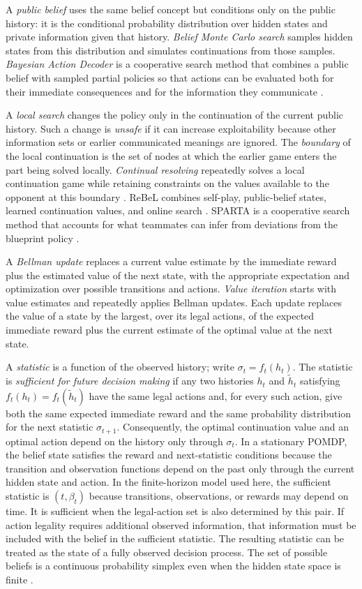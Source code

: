 A \emph{public belief} uses the same belief concept but conditions only on the public history: it is the conditional probability distribution over hidden states and private information given that history. \emph{Belief Monte Carlo search} samples hidden states from this distribution and simulates continuations from those samples. \emph{Bayesian Action Decoder} is a cooperative search method that combines a public belief with sampled partial policies so that actions can be evaluated both for their immediate consequences and for the information they communicate \cite{foerster2019bad}.

A \emph{local search} changes the policy only in the continuation of the current public history. Such a change is \emph{unsafe} if it can increase exploitability because other information sets or earlier communicated meanings are ignored. The \emph{boundary} of the local continuation is the set of nodes at which the earlier game enters the part being solved locally. \emph{Continual resolving} repeatedly solves a local continuation game while retaining constraints on the values available to the opponent at this boundary \cite{burch2014solving}. ReBeL combines self-play, public-belief states, learned continuation values, and online search \cite{brown2020rebel}. SPARTA is a cooperative search method that accounts for what teammates can infer from deviations from the blueprint policy \cite{lerer2020sparta}.

A \emph{Bellman update} replaces a current value estimate by the immediate reward plus the estimated value of the next state, with the appropriate expectation and optimization over possible transitions and actions. \emph{Value iteration} starts with value estimates and repeatedly applies Bellman updates. Each update replaces the value of a state by the largest, over its legal actions, of the expected immediate reward plus the current estimate of the optimal value at the next state.

A \emph{statistic} is a function of the observed history; write $\sigma_t=f_t(h_t)$. The statistic is \emph{sufficient for future decision making} if any two histories $h_t$ and $\widetilde h_t$ satisfying $f_t(h_t)=f_t(\widetilde h_t)$ have the same legal actions and, for every such action, give both the same expected immediate reward and the same probability distribution for the next statistic $\sigma_{t+1}$. Consequently, the optimal continuation value and an optimal action depend on the history only through $\sigma_t$. In a stationary POMDP, the belief state satisfies the reward and next-statistic conditions because the transition and observation functions depend on the past only through the current hidden state and action. In the finite-horizon model used here, the sufficient statistic is $(t,\beta_t)$ because transitions, observations, or rewards may depend on time. It is sufficient when the legal-action set is also determined by this pair. If action legality requires additional observed information, that information must be included with the belief in the sufficient statistic. The resulting statistic can be treated as the state of a fully observed decision process. The set of possible beliefs is a continuous probability simplex even when the hidden state space is finite \cite{kaelbling1998planning}.

